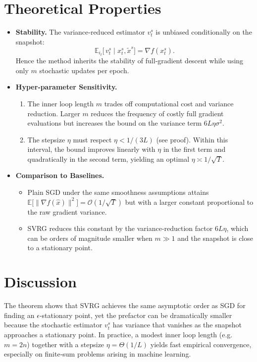 \documentclass{article}
\begin{document}
\section*{Theoretical Properties}
\begin{itemize}
\item \textbf{Stability.} The variance‑reduced estimator $v_{t}^{s}$ is unbiased conditionally on the snapshot:
\[
\mathbb{E}_{i_t}\!\big[\,v_{t}^{s}\mid x_{t}^{s},\tilde{x}^{s}\big]=\nabla f(x_{t}^{s}).
\]
Hence the method inherits the stability of full‑gradient descent while using only $m$ stochastic updates per epoch.

\item \textbf{Hyper‑parameter Sensitivity.}  
\begin{enumerate}[label=(\alph*)]
\item The inner loop length $m$ trades off computational cost and variance reduction. Larger $m$ reduces the frequency of costly full gradient evaluations but increases the bound on the variance term $6L\eta\sigma^{2}$.
\item The stepsize $\eta$ must respect $\eta<1/(3L)$ (see proof). Within this interval, the bound improves linearly with $\eta$ in the first term and quadratically in the second term, yielding an optimal $\eta\asymp 1/\sqrt{T}$.
\end{enumerate}
\item \textbf{Comparison to Baselines.}
\begin{itemize}
\item Plain SGD under the same smoothness assumptions attains $\mathbb{E}\big[\|\nabla f(\hat{x})\|^{2}\big]=\mathcal{O}(1/\sqrt{T})$ but with a larger constant proportional to the raw gradient variance.
\item SVRG reduces this constant by the variance‑reduction factor $6L\eta$, which can be orders of magnitude smaller when $m\gg 1$ and the snapshot is close to a stationary point.
\end{itemize}
\end{itemize}

\section*{Discussion}
The theorem shows that SVRG achieves the same asymptotic order as SGD for finding an $\epsilon$‑stationary point, yet the prefactor can be dramatically smaller because the stochastic estimator $v_{t}^{s}$ has variance that vanishes as the snapshot approaches a stationary point. In practice, a modest inner loop length (e.g. $m=2n$) together with a stepsize $\eta = \Theta(1/L)$ yields fast empirical convergence, especially on finite‑sum problems arising in machine learning.
\end{document}
